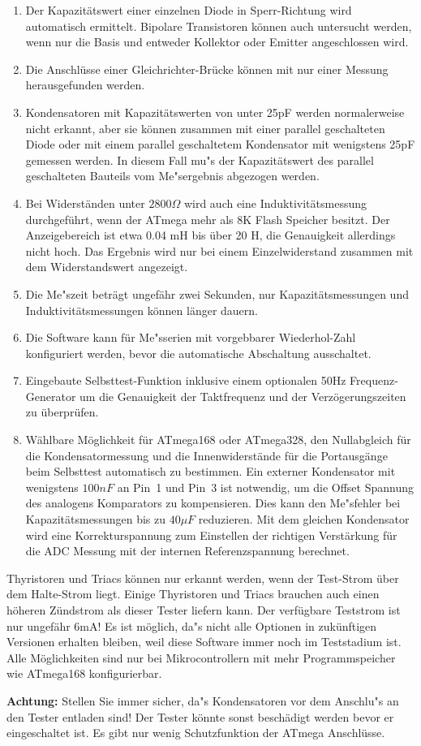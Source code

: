 \begin{enumerate}
\item Der Kapazit\"atswert einer einzelnen Diode in Sperr-Richtung wird automatisch ermittelt.
Bipolare Transistoren k\"onnen auch untersucht werden, wenn nur die Basis und entweder Kollektor oder Emitter angeschlossen wird.
\item Die Anschl\"usse einer Gleichrichter-Br\"ucke k\"onnen mit nur einer Messung herausgefunden werden.
\item Kondensatoren mit Kapazit\"atswerten von unter 25pF werden normalerweise nicht erkannt, 
aber sie k\"onnen zusammen mit einer parallel geschalteten Diode oder mit einem parallel geschaltetem Kondensator mit
wenigstens 25pF gemessen werden.
In diesem Fall mu"s der Kapazit\"atswert des parallel geschalteten Bauteils vom Me"sergebnis abgezogen werden.
\item Bei Widerst\"anden unter \(2800 \Omega\) wird auch eine Induktivit\"atsmessung durchgef\"uhrt, wenn der
ATmega mehr als 8K Flash Speicher besitzt.
Der Anzeigebereich ist etwa 0.04 mH bis \"uber 20 H, die Genauigkeit allerdings nicht hoch.
Das Ergebnis wird nur bei einem Einzelwiderstand zusammen mit dem Widerstandswert angezeigt.
\item Die Me"szeit betr\"agt ungef\"ahr zwei Sekunden, nur Kapazit\"atsmessungen und Induktivit\"atsmessungen k\"onnen l\"anger dauern.
\item Die Software kann f\"ur Me"sserien mit vorgebbarer Wiederhol-Zahl konfiguriert werden, bevor die automatische Abschaltung ausschaltet.
\item Eingebaute Selbsttest-Funktion inklusive einem optionalen 50Hz Frequenz-Generator um die Genauigkeit der Taktfrequenz
und der Verz\"ogerungszeiten zu \"uberpr\"ufen.
\item W\"ahlbare M\"oglichkeit f\"ur ATmega168 oder ATmega328, den Nullabgleich f\"ur die Kondensatormessung und die Innenwiderst\"ande f\"ur die
Portausg\"ange beim Selbsttest automatisch zu bestimmen.
Ein externer Kondensator mit wenigstens \(100 nF\) an Pin~1 und Pin~3 ist notwendig, um die Offset Spannung des analogens
Komparators zu kompensieren.
Dies kann den Me"sfehler bei Kapazit\"atsmessungen bis zu \(40 \mu F\) reduzieren.
Mit dem gleichen Kondensator wird eine Korrekturspannung zum Einstellen der richtigen Verst\"arkung f\"ur
die ADC Messung mit der internen Referenzspannung berechnet.
\end{enumerate}

Thyristoren und Triacs k\"onnen nur erkannt werden, wenn der Test-Strom \"uber dem Halte-Strom liegt.
Einige Thyristoren und Triacs brauchen auch einen h\"oheren Z\"undstrom als dieser Tester liefern kann.
Der verf\"ugbare Teststrom ist nur ungef\"ahr 6mA!
Es ist m\"oglich, da"s nicht alle Optionen in zuk\"unftigen Versionen erhalten bleiben, weil diese Software
immer noch im Teststadium ist.
Alle M\"oglichkeiten sind nur bei Mikrocontrollern mit mehr Programmspeicher wie ATmega168 konfigurierbar.

\vspace{1cm}
\textbf{{\Large Achtung:}} Stellen Sie immer sicher, da"s Kondensatoren vor dem Anschlu"s an den Tester entladen sind!
Der Tester k\"onnte sonst besch\"adigt werden bevor er eingeschaltet ist.
Es gibt nur wenig Schutzfunktion der ATmega Anschl\"usse.


